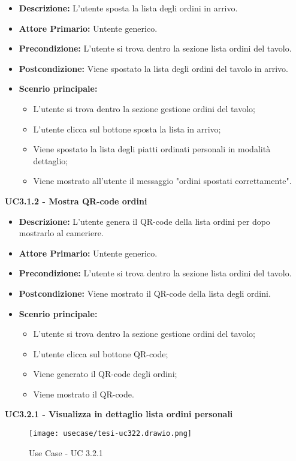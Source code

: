 \begin{itemize}
    \item \textbf{Descrizione:} L'utente sposta la lista degli ordini in arrivo.
    \item \textbf{Attore Primario:} Untente generico.
    \item \textbf{Precondizione:} L'utente si trova dentro la sezione lista ordini del tavolo.
    \item \textbf{Postcondizione:} Viene spostato la lista degli ordini del tavolo in arrivo.
    \item \textbf{Scenrio principale:}
    \begin{itemize}
        \item L'utente si trova dentro la sezione gestione ordini del tavolo;
        \item L'utente clicca sul bottone sposta la lista in arrivo;
        \item Viene spostato la lista degli piatti ordinati personali in modalità dettaglio;
        \item Viene mostrato all'utente il messaggio "ordini spostati correttamente".
    \end{itemize}
\end{itemize}
\textbf{UC3.1.2 - Mostra QR-code ordini}
\begin{itemize}
    \item \textbf{Descrizione:} L'utente genera il QR-code della lista ordini per dopo mostrarlo al cameriere.
    \item \textbf{Attore Primario:} Untente generico.
    \item \textbf{Precondizione:} L'utente si trova dentro la sezione lista ordini del tavolo.
    \item \textbf{Postcondizione:} Viene mostrato il QR-code della lista degli ordini.
    \item \textbf{Scenrio principale:}
    \begin{itemize}
        \item L'utente si trova dentro la sezione gestione ordini del tavolo;
        \item L'utente clicca sul bottone QR-code;
        \item Viene generato il QR-code degli ordini;
        \item Viene mostrato il QR-code.
    \end{itemize}
\end{itemize}
\textbf{UC3.2.1 - Visualizza in dettaglio lista ordini personali}
\begin{figure}[H]
    \centering
    \texttt{[image: usecase/tesi-uc322.drawio.png]}
    \caption{Use Case - UC 3.2.1}
\end{figure}
